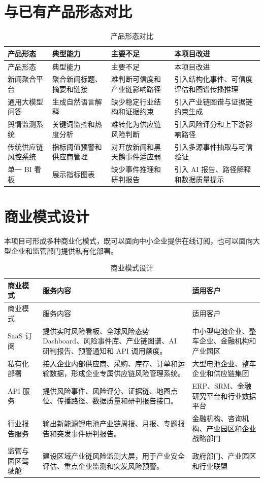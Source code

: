\documentclass[12pt,a4paper]{ctexart}
\begin{document}
\section{与已有产品形态对比}

\begin{longtable}{p{3.0cm}p{3.2cm}p{3.8cm}p{3.8cm}}
\caption{产品形态对比}\label{tab:comparison}\\
\toprule
产品形态 & 典型能力 & 主要不足 & 本项目改进 \\
\midrule
\endfirsthead
\toprule
产品形态 & 典型能力 & 主要不足 & 本项目改进 \\
\midrule
\endhead
新闻聚合平台 & 聚合新闻标题、摘要和链接 & 难判断可信度和产业链影响路径 & 引入结构化事件、可信度评估和图谱传播推理 \\
通用大模型问答 & 生成自然语言解释 & 缺少稳定行业结构和证据约束 & 引入产业链图谱与证据链约束生成 \\
舆情监测系统 & 关键词监控和热度分析 & 难转化为供应链风险判断 & 引入风险评分和上下游影响路径 \\
传统供应链风控系统 & 指标阈值预警和供应商管理 & 对开放新闻和黑天鹅事件适应弱 & 引入多源事件抽取与可信验证 \\
单一 BI 看板 & 展示指标图表 & 缺少事件推理和研判报告 & 引入 AI 报告、路径解释和数据质量提示 \\
\bottomrule
\end{longtable}

\section{商业模式设计}

本项目可形成多种商业化模式，既可以面向中小企业提供在线订阅，也可以面向大型企业和监管部门提供私有化部署。

\begin{longtable}{p{3.0cm}p{6.4cm}p{4.0cm}}
\caption{商业模式设计}\label{tab:business}\\
\toprule
商业模式 & 服务内容 & 适用客户 \\
\midrule
\endfirsthead
\toprule
商业模式 & 服务内容 & 适用客户 \\
\midrule
\endhead
SaaS 订阅 & 提供实时风险看板、全球风险态势 Dashboard、风险事件库、产业链图谱、AI 研判报告、预警通知和 API 调用额度。 & 中小型电池企业、整车企业、金融机构和产业园区 \\
私有化部署 & 接入企业内部供应商、采购、库存、订单和运输数据，形成企业专属供应链风险管理系统。 & 大型电池企业、整车企业和供应链集团 \\
API 服务 & 提供风险事件、风险评分、证据链、地图点位、传播路径、数据质量和研判报告接口。 & ERP、SRM、金融研究平台和行业数据平台 \\
行业报告服务 & 输出新能源锂电池产业链周报、月报、专题报告和突发事件研判报告。 & 金融机构、咨询机构、产业园区和企业战略部门 \\
监管与园区驾驶舱 & 建设区域产业链风险监测大屏，用于产业安全评估、重点企业监测和突发风险预警。 & 政府部门、产业园区和行业联盟 \\
\bottomrule
\end{longtable}
\end{document}
